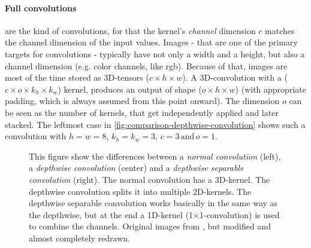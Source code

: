 \paragraph{Full convolutions} are the kind of convolutions, for that the kernel's \emph{channel} dimension $c$ matches the channel dimension of the input values.
Images - that are one of the primary targets for convolutions - typically have not only a width and a height, but also a channel dimension (e.g. color channels, like rgb).
Because of that, images are most of the time stored as 3D-tensors ($c \times h \times w$).
A 3D-convolution with a ($c \times o \times k_h \times k_w$) kernel, produces an output of shape ($o \times h \times w$) (with appropriate padding, which is always assumed from this point onward).
The dimension $o$ can be seen as the number of kernels, that get independently applied and later stacked.
The leftmost case in \autoref{fig:comparison-depthwise-convolution} shows such a convolution with $h = w=8,\, k_h =k_w = 3,\, c = 3 \mathrm{\,and\,} o=1$.

\begin{figure}[htbp]
    \centering
    \caption{This figure show the differences between a \emph{normal convolution} (left), a \emph{depthwise convolution}  (center) and a \emph{depthwise separable convolution} (right).
    The normal convolution has a 3D-kernel. 
    The depthwise convolution splits it into multiple 2D-kernels.
    The depthwise separable convolution works basically in the same way as the depthwise, but at the end a 1D-kernel (1$\times$1-convolution) is used to combine the channels.
     Original images from \cite{separableConvolutions}, but modified and almost completely redrawn.}
    \label{fig:comparison-depthwise-convolution}
\end{figure}

